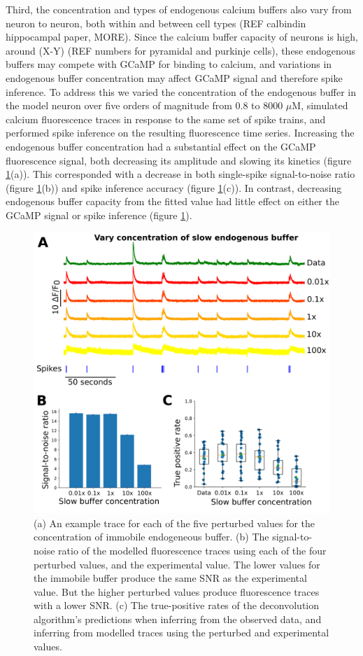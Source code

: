 \documentclass[a4paper,12pt]{article}
\theoremstyle{definition}
\begin{document}
Third, the concentration and types of endogenous calcium buffers also vary from neuron to neuron, both within and between cell types (REF calbindin hippocampal paper, MORE). Since the calcium buffer capacity of neurons is high, around (X-Y) (REF numbers for pyramidal and purkinje cells), these endogenous buffers may compete with GCaMP for binding to calcium, and variations in endogenous buffer concentration may affect GCaMP signal and therefore spike inference. To address this we varied the concentration of the endogenous buffer in the model neuron over five orders of magnitude from $0.8$ to $8000$ $\mu$M, simulated calcium fluorescence traces in response to the same set of spike trains, and performed spike inference on the resulting fluorescence time series. Increasing the endogenous buffer concentration had a substantial effect on the GCaMP fluorescence signal, both decreasing its amplitude and slowing its kinetics (figure \ref{fig:endogeneous_perturbed}(a)). This corresponded with a decrease in both single-spike signal-to-noise ratio (figure \ref{fig:endogeneous_perturbed}(b)) and spike inference accuracy (figure \ref{fig:endogeneous_perturbed}(c)). In contrast, decreasing endogenous buffer capacity from the fitted value had little effect on either the GCaMP signal or spike inference (figure \ref{fig:endogeneous_perturbed}).

\begin{figure}[p]
\centering
\includegraphics[width=0.7\linewidth]{figures/Figure_immobile.png}
\caption{(a) An example trace for each of the five perturbed values for the concentration of immobile endogeneous buffer.	(b) The signal-to-noise ratio of the modelled fluorescence traces using each of the four perturbed values, and the experimental value. The lower values for the immobile buffer produce the same SNR as the experimental value. But the higher perturbed values produce fluorescence traces with a lower SNR.	(c) The true-positive rates of the deconvolution algorithm's predictions when inferring from the observed data, and inferring from modelled traces using the perturbed and experimental values.}
    \label{fig:endogeneous_perturbed}
\end{figure}
\end{document}
